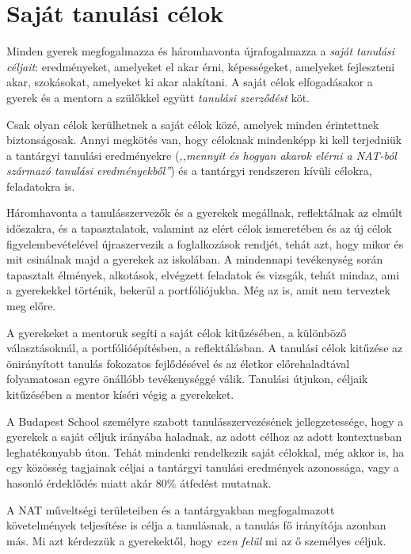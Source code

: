 \hypertarget{sajat-tanulasi-celok}{%
\section{Saját tanulási célok}\label{sajat-tanulasi-celok}}

Minden gyerek megfogalmazza és háromhavonta újrafogalmazza a \emph{saját
tanulási céljait}: eredményeket, amelyeket el akar érni, képességeket,
amelyeket fejleszteni akar, szokásokat, amelyeket ki akar alakítani. A
saját célok elfogadásakor a gyerek és a mentora a szülőkkel együtt
\emph{tanulási szerződést} köt.

Csak olyan célok kerülhetnek a saját célok közé, amelyek minden
érintettnek biztonságosak. Annyi megkötés van, hogy céloknak mindenképp
ki kell terjedniük a tantárgyi tanulási eredményekre (\emph{,,mennyit és
hogyan akarok elérni a NAT-ból származó tanulási eredményekből''}) és a
tantárgyi rendszeren kívüli célokra, feladatokra is.

Háromhavonta a tanulásszervezők és a gyerekek megállnak, reflektálnak az
elmúlt időszakra, és a tapasztalatok, valamint az elért célok
ismeretében és az új célok figyelembevételével újraszervezik a
foglalkozások rendjét, tehát azt, hogy mikor és mit csinálnak majd a
gyerekek az iskolában. A mindennapi tevékenység során tapasztalt
élmények, alkotások, elvégzett feladatok és vizsgák, tehát
mindaz, ami a gyerekekkel történik, bekerül a portfóliójukba. Még az is,
amit nem terveztek meg előre.

A gyerekeket a mentoruk segíti a saját célok kitűzésében, a különböző
választásoknál, a portfólióépítésben, a reflektálásban. A tanulási célok
kitűzése az önirányított tanulás fokozatos fejlődésével és az életkor
előrehaladtával folyamatosan egyre önállóbb tevékenységgé válik.
Tanulási útjukon, céljaik kitűzésében a mentor kíséri végig a gyerekeket.

A Budapest School személyre szabott tanulásszervezésének
jellegzetessége, hogy a gyerekek a saját céljuk irányába haladnak, az
adott célhoz az adott kontextusban leghatékonyabb úton. Tehát mindenki
rendelkezik saját célokkal, még akkor is, ha egy közösség tagjainak
céljai a tantárgyi tanulási eredmények azonossága, vagy a hasonló
érdeklődés miatt akár 80\% átfedést mutatnak.

A NAT műveltségi területeiben és a tantárgyakban megfogalmazott
követelmények teljesítése is célja a tanulásnak, a tanulás fő irányítója
azonban más. Mi azt kérdezzük a gyerekektől, hogy \emph{ezen felül} mi
az ő személyes céljuk.
